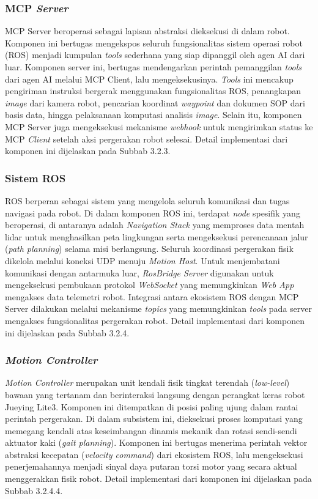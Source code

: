 \subsubsection{MCP \textit{Server}}
MCP Server beroperasi sebagai lapisan abstraksi dieksekusi di dalam robot. Komponen ini bertugas mengekspos seluruh fungsionalitas sistem operasi robot (ROS) menjadi kumpulan \textit{tools} sederhana yang siap dipanggil oleh agen AI dari luar. Komponen server ini, bertugas mendengarkan perintah pemanggilan \textit{tools} dari agen AI melalui MCP Client, lalu mengeksekusinya. \textit{Tools} ini mencakup pengiriman instruksi bergerak menggunakan fungsionalitas ROS, penangkapan \textit{image} dari kamera robot, pencarian koordinat \textit{waypoint} dan dokumen SOP dari basis data, hingga pelaksanaan komputasi analisis \textit{image}. Selain itu, komponen MCP Server juga mengeksekusi mekanisme \textit{webhook} untuk mengirimkan status ke MCP \textit{Client} setelah aksi pergerakan robot selesai. Detail implementasi dari komponen ini dijelaskan pada Subbab 3.2.3.

\subsubsection{Sistem ROS}
ROS berperan sebagai sistem yang mengelola seluruh komunikasi dan tugas navigasi pada robot. Di dalam komponen ROS ini, terdapat \textit{node} spesifik yang beroperasi, di antaranya adalah \textit{Navigation Stack} yang memproses data mentah lidar untuk menghasilkan peta lingkungan serta mengeksekusi perencanaan jalur (\textit{path planning}) selama misi berlangsung. Seluruh koordinasi pergerakan fisik dikelola melalui koneksi UDP menuju \textit{Motion Host}. Untuk menjembatani komunikasi dengan antarmuka luar, \textit{RosBridge Server} digunakan untuk mengeksekusi pembukaan protokol \textit{WebSocket} yang memungkinkan \textit{Web App} mengakses data telemetri robot. Integrasi antara ekosistem ROS dengan MCP Server dilakukan melalui mekanisme \textit{topics} yang memungkinkan \textit{tools} pada server mengakses fungsionalitas pergerakan robot. Detail implementasi dari komponen ini dijelaskan pada Subbab 3.2.4.

\subsubsection{\textit{Motion Controller}}
\textit{Motion Controller} merupakan unit kendali fisik tingkat terendah (\textit{low-level}) bawaan yang tertanam dan berinteraksi langsung dengan perangkat keras robot Jueying Lite3. Komponen ini ditempatkan di posisi paling ujung dalam rantai perintah pergerakan. Di dalam subsistem ini, dieksekusi proses komputasi yang memegang kendali atas keseimbangan dinamis mekanik dan rotasi sendi-sendi aktuator kaki (\textit{gait planning}). Komponen ini bertugas menerima perintah vektor abstraksi kecepatan (\textit{velocity command}) dari ekosistem ROS, lalu mengeksekusi penerjemahannya menjadi sinyal daya putaran torsi motor yang secara aktual menggerakkan fisik robot. Detail implementasi dari komponen ini dijelaskan pada Subbab 3.2.4.4.


